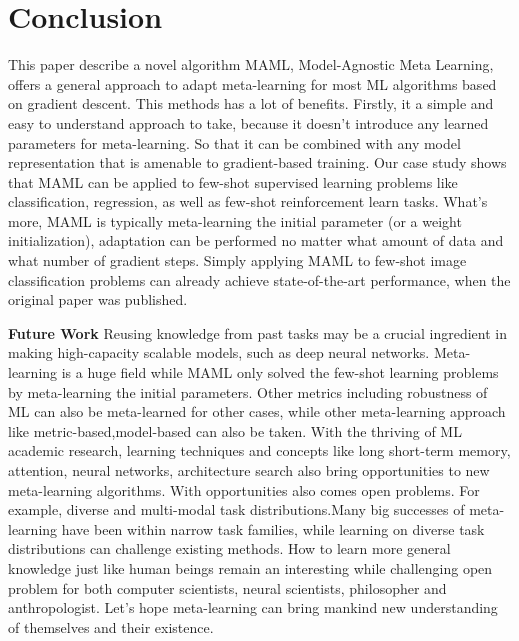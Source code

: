 \section{Conclusion}

This paper describe a novel algorithm MAML, Model-Agnostic Meta Learning, offers a general approach to adapt meta-learning for most ML algorithms based on gradient descent. 
This methods has a lot of benefits. Firstly, it a simple and easy to understand approach to take, because it doesn't introduce any learned parameters for meta-learning. So that it can be combined with any model representation that is amenable to gradient-based training. Our case study shows that MAML can be applied to few-shot supervised learning problems like classification, regression, as well as few-shot reinforcement learn tasks. What's more, MAML is typically meta-learning the initial parameter (or a weight initialization), adaptation can be performed no matter what amount of data and what number of gradient steps. Simply applying MAML to few-shot image classification problems can already achieve state-of-the-art performance, when the original paper was published. 

\textbf{Future Work} 
Reusing knowledge from past tasks may be a crucial ingredient in making high-capacity scalable models, such as deep neural networks. 
Meta-learning is a huge field while MAML only solved the few-shot learning problems by meta-learning the initial parameters. Other metrics including robustness of ML can also be meta-learned for other cases, while other meta-learning approach like  metric-based,model-based can also be taken. With the thriving of ML academic research, learning techniques and concepts like long short-term memory, attention, neural networks, architecture search also bring opportunities to new meta-learning algorithms.
With opportunities also comes open problems. For example, diverse and multi-modal task distributions.Many big successes of meta-learning have been within narrow task families, while learning on diverse task distributions can challenge existing methods. How to learn more general knowledge just like human beings remain an interesting while challenging open problem for both computer scientists, neural scientists, philosopher and anthropologist. Let's hope meta-learning can bring mankind new understanding of themselves and their existence.


